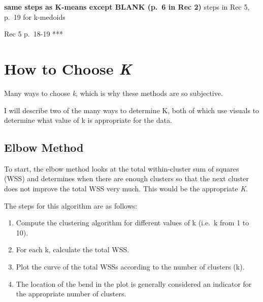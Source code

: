 \documentclass[12pt,twoside]{amherstthesis}
\providecommand{\tightlist}{%
  \setlength{\itemsep}{0pt}\setlength{\parskip}{0pt}}
\begin{document}
  \textbf{same steps as K-means except BLANK (p.~6 in Rec 2) }steps in Rec
  5, p.~19 for k-medoids
  
  Rec 5 p.~18-19 ***
  
  \begin{Shaded}
  \begin{Highlighting}[]
  \end{Highlighting}
  \end{Shaded}
  
  \section{\texorpdfstring{How to Choose
  \emph{K}}{How to Choose K}}\label{how-to-choose-k}
  
  Many ways to choose \emph{k}, which is why these methods are so
  subjective.
  
  I will describe two of the many ways to determine K, both of which use
  visuals to determine what value of k is appropriate for the data.
  
  \subsection{Elbow Method}\label{elbow-method}
  
  To start, the elbow method looks at the total within-cluster sum of
  squares (WSS) and determines when there are enough clusters so that the
  next cluster does not improve the total WSS very much. This would be the
  appropriate \emph{K}.
  
  The steps for this algorithm are as follows:
  
  \begin{enumerate}
  \def\labelenumi{\arabic{enumi}.}
  \tightlist
  \item
    Compute the clustering algorithm for different values of k (i.e.~k
    from 1 to 10).
  \item
    For each k, calculate the total WSS.
  \item
    Plot the curve of the total WSSs according to the number of clusters
    (k).
  \item
    The location of the bend in the plot is generally considered an
    indicator for the appropriate number of clusters.
  \end{enumerate}
  
\end{document}

